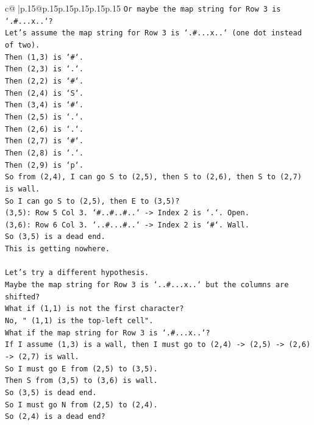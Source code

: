 \documentclass{article}
\begin{document}
{\begin{supertabular}{c@{$\;$}|p{.15\linewidth}@{}p{.15\linewidth}p{.15\linewidth}p{.15\linewidth}p{.15\linewidth}p{.15\linewidth}}
{{{\texttt{Or maybe the map string for Row 3 is `.\#...x..`?} \\
\texttt{Let's assume the map string for Row 3 is `.\#...x..` (one dot instead of two).} \\
\texttt{Then (1,3) is `\#`.} \\
\texttt{Then (2,3) is `.`.} \\
\texttt{Then (2,2) is `\#`.} \\
\texttt{Then (2,4) is `S`.} \\
\texttt{Then (3,4) is `\#`.} \\
\texttt{Then (2,5) is `.`.} \\
\texttt{Then (2,6) is `.`.} \\
\texttt{Then (2,7) is `\#`.} \\
\texttt{Then (2,8) is `.`.} \\
\texttt{Then (2,9) is `p`.} \\
\texttt{So from (2,4), I can go S to (2,5), then S to (2,6), then S to (2,7) is wall.} \\
\texttt{So I can go S to (2,5), then E to (3,5)?} \\
\texttt{(3,5): Row 5 Col 3. `\#..\#..\#..` {-}> Index 2 is `.`. Open.} \\
\texttt{(3,6): Row 6 Col 3. `..\#...\#..` {-}> Index 2 is `\#`. Wall.} \\
\texttt{So (3,5) is a dead end.} \\
\texttt{This is getting nowhere.} \\
\\ 
\texttt{Let's try a different hypothesis.} \\
\texttt{Maybe the map string for Row 3 is `..\#...x..` but the columns are shifted?} \\
\texttt{What if (1,1) is not the first character?} \\
\texttt{No, " (1,1) is the top{-}left cell".} \\
\texttt{What if the map string for Row 3 is `.\#...x..`?} \\
\texttt{If I assume (1,3) is a wall, then I must go to (2,4) {-}> (2,5) {-}> (2,6) {-}> (2,7) is wall.} \\
\texttt{So I must go E from (2,5) to (3,5).} \\
\texttt{Then S from (3,5) to (3,6) is wall.} \\
\texttt{So (3,5) is dead end.} \\
\texttt{So I must go N from (2,5) to (2,4).} \\
\texttt{So (2,4) is a dead end?} \\
}}}
\end{supertabular}}
\end{document}
